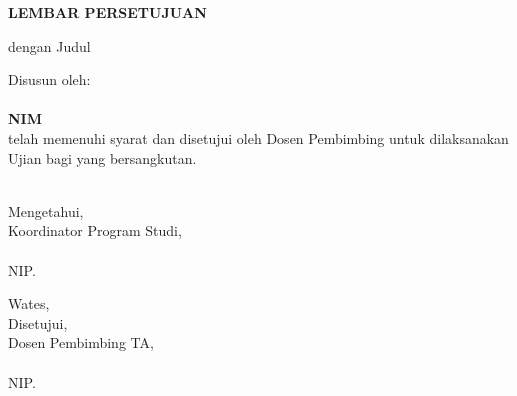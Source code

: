 
\newpage
{}
\begin{center}
    \begin{doublespace}
        \textbf{\large \MakeUppercase{lembar persetujuan}}
    \end{doublespace}
\end{center}

\begin{center}
    {\tipe} dengan Judul
\end{center}

\begin{center}
    \begin{doublespace}
        \textbf{\large \MakeUppercase {\judulid}}
    \end{doublespace}
\end{center}

\begin{center}
    Disusun oleh:\\
    \textbf{\penulis}\\
    \textbf{NIM \nim}\\[1.5cm]

    telah memenuhi syarat dan disetujui oleh Dosen Pembimbing untuk dilaksanakan Ujian {\tipe} bagi yang bersangkutan.\\[0.75cm]
\end{center}

\begin{minipage}{0.35\textwidth}
    \hfill\\[2em]
    Mengetahui,\\
    Koordinator Program Studi,\\[2cm]
    \koorprodi\\
    NIP. \NIPkoorprodi
\end{minipage}
\hfill
\begin{minipage}{0.47\textwidth}
    Wates, \tglpersetujuan\\[1em]
    Disetujui,\\
    Dosen Pembimbing TA,\\[2cm]
    \pembimbing\\
    NIP. \NIPpembimbing
\end{minipage}%
